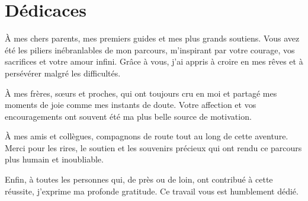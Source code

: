 \chapter*{Dédicaces}
\thispagestyle{empty}

\vspace*{2.5cm}

\begin{center}
\begin{minipage}{0.85\textwidth}
\setlength{\parindent}{0pt}
\setlength{\parskip}{0.9em}

À mes chers parents, mes premiers guides et mes plus grands soutiens. Vous avez été les piliers inébranlables de mon parcours, m’inspirant par votre courage, vos sacrifices et votre amour infini. Grâce à vous, j’ai appris à croire en mes rêves et à persévérer malgré les difficultés.

À mes frères, sœurs et proches, qui ont toujours cru en moi et partagé mes moments de joie comme mes instants de doute. Votre affection et vos encouragements ont souvent été ma plus belle source de motivation.

À mes amis et collègues, compagnons de route tout au long de cette aventure. Merci pour les rires, le soutien et les souvenirs précieux qui ont rendu ce parcours plus humain et inoubliable.

Enfin, à toutes les personnes qui, de près ou de loin, ont contribué à cette réussite, j’exprime ma profonde gratitude. Ce travail vous est humblement dédié.


\end{minipage}
\end{center}

\clearpage